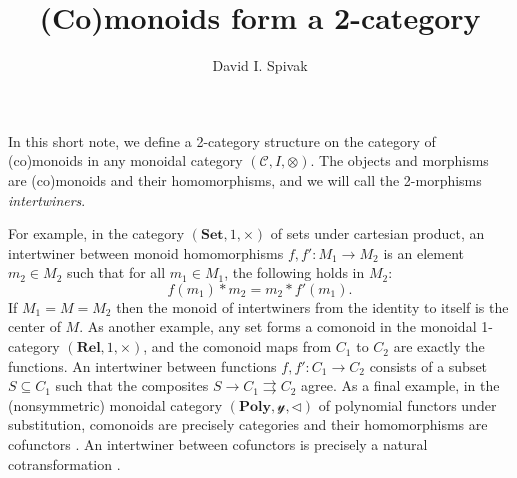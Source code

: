 \documentclass[11pt, one side, article]{memoir}
\theoremstyle{definition}
\theoremstyle{plain}
\renewcommand{\ss}{\subseteq}
\newcommand{\cat}[1]{\mathcal{#1}}%
\newcommand{\Cat}[1]{\mathbf{#1}}%
\newcommand{\tto}{\rightrightarrows}
\newcommand{\smset}{\Cat{Set}}
\newcommand{\yon}{\mathcal{y}}
\newcommand{\poly}{\Cat{Poly}}
\newcommand{\0}{\textsf{0}}
\newcommand{\1}{\tn{\textsf{1}}}
\newcommand{\tri}{\mathbin{\triangleleft}}
\begin{document}
\title{(Co)monoids form a 2-category}

\author{David I. Spivak}

\date{\vspace{-5pt}}

\maketitle


In this short note, we define a 2-category structure on the category of (co)monoids in any monoidal category $(\cat{C},I,\otimes)$. The objects and morphisms are (co)monoids and their homomorphisms, and we will call the 2-morphisms \emph{intertwiners}.

For example, in the category $(\smset,1,\times)$ of sets under cartesian product, an intertwiner between monoid homomorphisms $f,f'\colon M_1\to M_2$ is an element $m_2\in M_2$ such that for all $m_1\in M_1$, the following holds in $M_2$:
\[
f(m_1)*m_2=m_2*f'(m_1).
\]
If $M_1=M=M_2$ then the monoid of intertwiners from the identity to itself is the center of $M$. As another example, any set forms a comonoid in the monoidal 1-category $(\Cat{Rel},1,\times)$, and the comonoid maps from $C_1$ to $C_2$ are exactly the functions. An intertwiner between functions $f,f'\colon C_1\to C_2$ consists of a subset $S\ss C_1$ such that the composites $S\to C_1\tto C_2$ agree. As a final example, in the (nonsymmetric) monoidal category $(\poly,\yon,\tri)$ of polynomial functors under substitution, comonoids are precisely categories \cite{ahman2016directed} and their homomorphisms are cofunctors \cite{aguiar1997internal}. An intertwiner between cofunctors is precisely a natural cotransformation \cite{clarke2022introduction,spivak2023cofunctors}.
\end{document}
